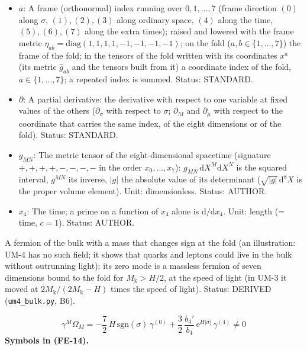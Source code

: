 \documentclass[
  10pt,
]{article}
\begin{document}
\begin{itemize}
  along the coordinates, \(\gamma^M = \mathbf{e}_a{}^MT^a\),
  \(\gamma_M = g_{MN}\gamma^N\); \(\gamma^{(a)} = T^a\) along the frame
  direction \((a)\) (\(\gamma^{(0)}\) along \(\sigma\), \(\gamma^{(4)}\)
  along the time). Unit: dimensionless. Status: AUTHOR.
\item
  \(a\): A frame (orthonormal) index running over \(0, 1, \dots, 7\)
  (frame direction \((0)\) along \(\sigma\), \((1), (2), (3)\) along
  ordinary space, \((4)\) along the time, \((5), (6), (7)\) along the
  extra times); raised and lowered with the frame metric
  \(\eta_{ab} = \mathrm{diag}(1, 1, 1, 1, -1, -1, -1, -1)\); on the fold
  (\(a, b \in \{1, \dots, 7\}\)) the frame of the fold; in the tensors
  of the fold written with its coordinates \(x^a\) (its metric
  \(\hat g_{ab}\) and the tensors built from it) a coordinate index of
  the fold, \(a \in \{1, \dots, 7\}\); a repeated index is summed.
  Status: STANDARD.
\item
  \(\partial\): A partial derivative: the derivative with respect to one
  variable at fixed values of the others (\(\partial_\sigma\) with
  respect to \(\sigma\); \(\partial_M\) and \(\partial_\mu\) with
  respect to the coordinate that carries the same index, of the eight
  dimensions or of the fold). Status: STANDARD.
\item
  \(g_{MN}\): The metric tensor of the eight-dimensional spacetime
  (signature \(+,+,+,+,-,-,-,-\) in the order \(x_0, \dots, x_7\)):
  \(g_{MN}\,\mathrm{d}X^M\mathrm{d}X^N\) is the squared interval,
  \(g^{MN}\) its inverse, \(\lvert g\rvert\) the absolute value of its
  determinant (\(\sqrt{\lvert g\rvert}\,\mathrm{d}^8X\) is the proper
  volume element). Unit: dimensionless. Status: AUTHOR.
\item
  \(x_4\): The time; a prime on a function of \(x_4\) alone is
  \(\mathrm{d}/\mathrm{d}x_4\). Unit: length (= time, \(c = 1\)).
  Status: AUTHOR.
\end{itemize}

A fermion of the bulk with a mass that changes sign at the fold (an
illustration: UM-4 has no such field; it shows that quarks and leptons
could live in the bulk without outrunning light): its zero mode is a
massless fermion of seven dimensions bound to the fold for
\(M_{\mathrm{k}} > H/2\), at the speed of light (in UM-3 it moved at
\(2M_{\mathrm{k}}/(2M_{\mathrm{k}} - H)\) times the speed of light).
Status: DERIVED (\texttt{um4\_bulk.py}, B6).

\[
\gamma^M\Omega_M = -\frac72\,H\,\mathrm{sgn}(\sigma)\,\gamma^{(0)} + \frac32\,\frac{b_4'}{b_4}\,\mathrm{e}^{H\lvert\sigma\rvert}\,\gamma^{(4)} \ne 0 \tag{FE-14}
\] \textbf{Symbols in (FE-14).}
\end{document}
